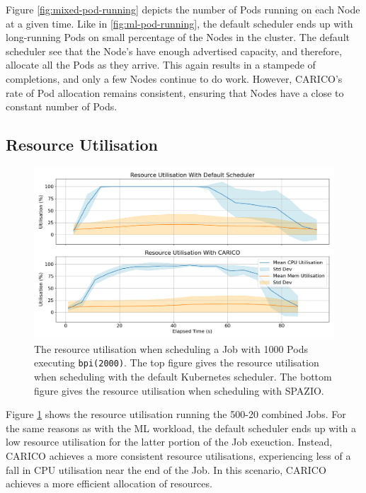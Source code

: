Figure \ref{fig:mixed-pod-running} depicts the number of Pods running on each Node
at a given time. Like in \ref{fig:ml-pod-running}, the default scheduler ends up
with long-running Pods on small percentage of the Nodes in the cluster. The
default scheduler see that the Node's have enough advertised capacity, and
therefore, allocate all the Pods as they arrive. This again results in a
stampede of completions, and only a few Nodes continue to do work. However,
CARICO's rate of Pod allocation remains consistent, ensuring that Nodes have a
close to constant number of Pods.

\subsection{Resource Utilisation}

\begin{figure}[H]
    \centering
    \includegraphics[width=\textwidth]{images/mixed-util.png}
    \caption{The resource utilisation when scheduling a Job with 1000 Pods
    executing \texttt{bpi(2000)}. The top figure gives the resource utilisation
    when scheduling with the default Kubernetes scheduler. The bottom figure
    gives the resource utilisation when scheduling with SPAZIO.}
    \label{fig:mixed-util}
\end{figure}

Figure \ref{fig:mixed-util} shows the resource utilisation running the 500-20
combined Jobs. For the same reasons as with the  ML workload, the default
scheduler ends up with a low resource utilisation for the
latter portion of the Job exeuction. Instead, CARICO achieves a more consistent
resource utilisations, experiencing less of a fall in CPU utilisation near the
end of the Job. In this scenario, CARICO achieves a more efficient allocation of
resources.

